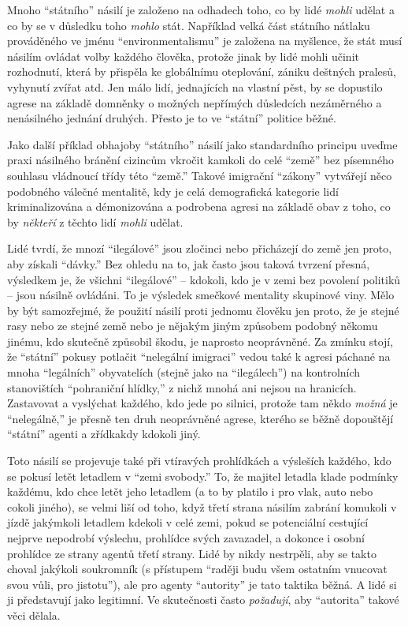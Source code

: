\documentclass{book}
\begin{document}
Mnoho \enquote{státního} násilí je založeno na odhadech toho, co by lidé \emph{mohli} udělat a co by se v důsledku toho \emph{mohlo} stát. Například velká část státního nátlaku prováděného ve jménu \enquote{environmentalismu} je založena na myšlence, že stát musí násilím ovládat volby každého člověka, protože jinak by lidé mohli učinit rozhodnutí, která by přispěla ke globálnímu oteplování, zániku deštných pralesů, vyhynutí zvířat atd. Jen málo lidí, jednajících na vlastní pěst, by se dopustilo agrese na základě domněnky o možných nepřímých důsledcích nezáměrného a nenásilného jednání druhých. Přesto je to ve \enquote{státní} politice běžné.

Jako další příklad obhajoby \enquote{státního} násilí jako standardního principu uveďme praxi násilného bránění cizincům vkročit kamkoli do celé \enquote{země} bez písemného souhlasu vládnoucí třídy této \enquote{země.} Takové imigrační \enquote{zákony} vytvářejí něco podobného válečné mentalitě, kdy je celá demografická kategorie lidí kriminalizována a démonizována a podrobena agresi na základě obav z toho, co by \emph{někteří} z těchto lidí \emph{mohli} udělat.

Lidé tvrdí, že mnozí \enquote{ilegálové} jsou zločinci nebo přicházejí do země jen proto, aby získali \enquote{dávky.} Bez ohledu na to, jak často jsou taková tvrzení přesná, výsledkem je, že všichni \enquote{ilegálové} -- kdokoli, kdo je v zemi bez povolení politiků -- jsou násilně ovládáni. To je výsledek smečkové mentality skupinové viny. Mělo by být samozřejmé, že použití násilí proti jednomu člověku jen proto, že je stejné rasy nebo ze stejné země nebo je nějakým jiným způsobem podobný někomu jinému, kdo skutečně způsobil škodu, je naprosto neoprávněné. Za zmínku stojí, že \enquote{státní} pokusy potlačit \enquote{nelegální imigraci} vedou také k agresi páchané na mnoha \enquote{legálních} obyvatelích (stejně jako na \enquote{ilegálech}) na kontrolních stanovištích \enquote{pohraniční hlídky,} z nichž mnohá ani nejsou na hranicích. Zastavovat a vyslýchat každého, kdo jede po silnici, protože tam někdo \emph{možná} je \enquote{nelegálně,} je přesně ten druh neoprávněné agrese, kterého se běžně dopouštějí \enquote{státní} agenti a zřídkakdy kdokoli jiný.

Toto násilí se projevuje také při vtíravých prohlídkách a výsleších každého, kdo se pokusí letět letadlem v \enquote{zemi svobody.} To, že majitel letadla klade podmínky každému, kdo chce letět jeho letadlem (a to by platilo i pro vlak, auto nebo cokoli jiného), se velmi liší od toho, když třetí strana násilím zabrání komukoli v jízdě jakýmkoli letadlem kdekoli v celé zemi, pokud se potenciální cestující nejprve nepodrobí výslechu, prohlídce svých zavazadel, a dokonce i osobní prohlídce ze strany agentů třetí strany. Lidé by nikdy nestrpěli, aby se takto choval jakýkoli soukromník (s přístupem \enquote{raději budu všem ostatním vnucovat svou vůli, pro jistotu}), ale pro agenty \enquote{autority} je tato taktika běžná. A lidé si ji představují jako legitimní. Ve skutečnosti často \emph{požadují}, aby \enquote{autorita} takové věci dělala.
\end{document}
